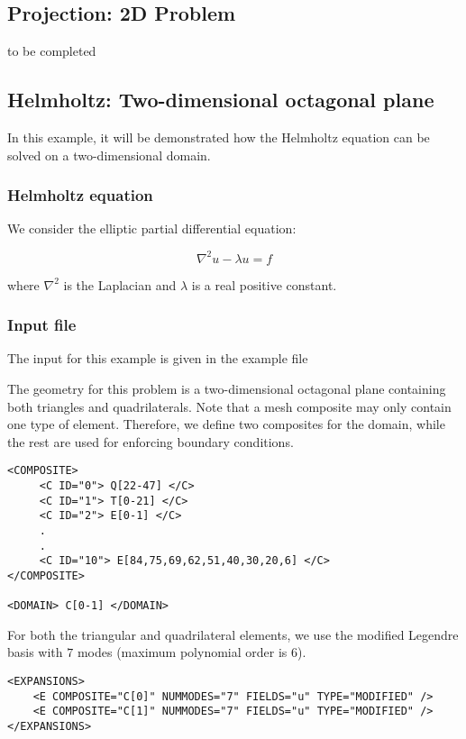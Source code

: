 \subsection{Projection: 2D Problem}
to be completed


\subsection{Helmholtz: Two-dimensional octagonal plane}

In this example, it will be demonstrated how the Helmholtz equation can be solved on a two-dimensional domain.

\subsubsection{Helmholtz equation}

We consider the elliptic partial differential equation:

\begin{equation}
\nabla^2 u  - \lambda u =  f
\end{equation}

where $\nabla^2$ is the Laplacian and $\lambda$ is a real positive constant.

\subsubsection{Input file}

The input for this example is given in the example file

The geometry for this problem is a two-dimensional octagonal plane containing
both triangles and quadrilaterals. Note that a mesh composite may only contain
one type of element. Therefore, we define two composites for the domain, while
the rest are used for enforcing boundary conditions.
\begin{lstlisting}[style=XMLStyle]
<COMPOSITE>
     <C ID="0"> Q[22-47] </C>
     <C ID="1"> T[0-21] </C>
     <C ID="2"> E[0-1] </C>
     .
     .
     <C ID="10"> E[84,75,69,62,51,40,30,20,6] </C>
</COMPOSITE>

<DOMAIN> C[0-1] </DOMAIN>
\end{lstlisting}

For both the triangular and quadrilateral elements, we use the modified Legendre
basis with $7$ modes (maximum polynomial order is $6$).
\begin{lstlisting}[style=XMLStyle]
<EXPANSIONS>
    <E COMPOSITE="C[0]" NUMMODES="7" FIELDS="u" TYPE="MODIFIED" />
    <E COMPOSITE="C[1]" NUMMODES="7" FIELDS="u" TYPE="MODIFIED" />
</EXPANSIONS>
\end{lstlisting}

